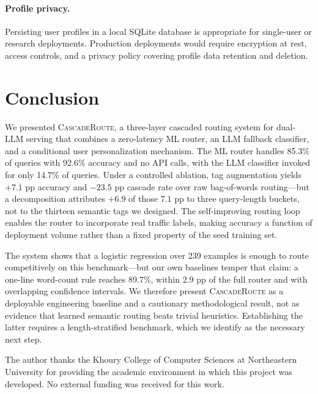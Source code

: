 \documentclass{article}
\newcommand{\system}{\textsc{CascadeRoute}}
\begin{document}
\paragraph{Profile privacy.}
Persisting user profiles in a local SQLite database is appropriate for
single-user or research deployments. Production deployments would require
encryption at rest, access controls, and a privacy policy covering profile
data retention and deletion.

\section{Conclusion}
\label{sec:conclusion}

We presented \system{}, a three-layer cascaded routing system for dual-LLM
serving that combines a zero-latency ML router, an LLM fallback classifier,
and a conditional user personalization mechanism. The ML router handles
85.3\% of queries with 92.6\% accuracy and no API calls, with the LLM
classifier invoked for only 14.7\% of queries. Under a controlled ablation, tag
augmentation yields $+7.1$ pp accuracy and $-23.5$ pp cascade rate over raw
bag-of-words routing---but a decomposition attributes $+6.9$ of those $7.1$ pp
to three query-length buckets, not to the thirteen semantic tags we designed.
The self-improving routing loop enables the router to incorporate real
traffic labels, making accuracy a function of deployment volume rather
than a fixed property of the seed training set.

The system shows that a logistic regression over 239 examples is enough to
route competitively on this benchmark---but our own baselines temper that
claim: a one-line word-count rule reaches 89.7\%, within 2.9 pp of the full
router and with overlapping confidence intervals. We therefore present
\system{} as a deployable engineering baseline and a cautionary methodological
result, not as evidence that learned semantic routing beats trivial heuristics.
Establishing the latter requires a length-stratified benchmark, which we
identify as the necessary next step.


\begin{ack}
The author thanks the Khoury College of Computer Sciences at Northeastern
University for providing the academic environment in which this project was
developed. No external funding was received for this work.
\end{ack}
\end{document}
